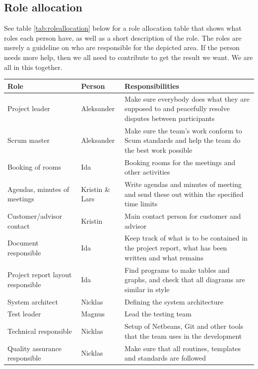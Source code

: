 \subsection{Role allocation}
See table \ref{tab:roleallocation} below for a role allocation table that shows what roles each person have, as well as a short description of the role. The roles are merely a guideline on who are responsible for the depicted area. If the person needs more help, then we all need to contribute to get the result we want. We are all in this together.
\begin{table}[h!]
\begin{center}
\begin{tabularx}{\linewidth}{>{\setlength\hsize{.5\hsize}}X|>{\setlength\hsize{0.3\hsize}}X|>{\setlength\hsize{1\hsize}}X} \hline
\textbf{Role} & \textbf{Person} & \textbf{Responsibilities} \\ \hline \hline
Project leader & Aleksander & Make sure everybody does what they are supposed to and peacefully resolve disputes between participants \\  \hline
Scrum master & Aleksander & Make sure the team’s work conform to Scum standards and help the team do the best work possible \\ \hline
Booking of rooms & Ida & Booking rooms for the meetings and other activities \\ \hline
Agendas, minutes of meetings & Kristin \& Lars &Write agendas and minutes of meeting and send these out within the specified time limits \\ \hline
Customer/advisor contact & Kristin & Main contact person for customer and advisor \\ \hline
Document responsible & Ida &Keep track of what is to be contained in the project report, what has been written and what remains \\ \hline
Project report layout responsible & Ida &Find programs to make tables and graphs, and check that all diagrams are similar in style \\ \hline
System architect & Nicklas & Defining the system architecture \\ \hline
Test leader & Magnus & Lead the testing team \\ \hline
Technical responsible & Nicklas & Setup of Netbeans, Git and other tools that the team uses in the development \\ \hline
Quality assurance responsible & Nicklas & Make sure that all routines, templates and standards are followed \\ \hline

\end{tabularx}
\end{center}
\end{table}
